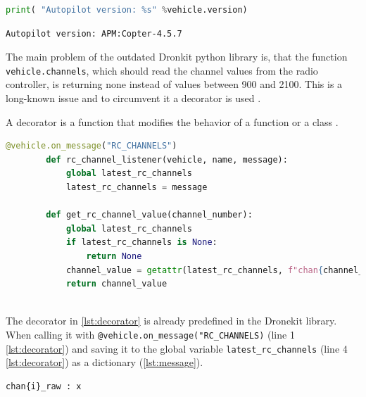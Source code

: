 \documentclass[svgnames]{article}
\begin{document}
	\begin{lstlisting}[language=python, caption={information retrieval}, label=lst:listing-autopilot, style=myPython]
		print( "Autopilot version: %s" %vehicle.version)
	\end{lstlisting}
	\begin{lstlisting}[caption= output from \cref{lst:listing-autopilot}]
		Autopilot version: APM:Copter-4.5.7
	\end{lstlisting}

	The main problem of the outdated Dronkit python library is, that the function \lstinline|vehicle.channels|, which should read the channel values from the radio controller, is returning none instead of values between 900 and 2100. This is a long-known issue and to circumvent it a decorator is used \cite{rcchannelissue}. 

	\begin{Explanation}[Decorator]
		\item A decorator is a function that modifies the behavior of a function or a class \cite{decorator}.
	\end{Explanation} 
	
	\begin{lstlisting}[language=python, style=myPython, label=lst:decorator, caption={decorator for channel values}]
		@vehicle.on_message("RC_CHANNELS")
		def rc_channel_listener(vehicle, name, message):
			global latest_rc_channels
			latest_rc_channels = message
		
		def get_rc_channel_value(channel_number):
			global latest_rc_channels
			if latest_rc_channels is None:
				return None
			channel_value = getattr(latest_rc_channels, f"chan{channel_number}_raw", None)
			return channel_value
		
	\end{lstlisting}
	The decorator in \cref{lst:decorator} is already predefined in the Dronekit library. When calling it with \lstinline|@vehicle.on_message("RC_CHANNELS)| (line 1 \cref{lst:decorator}) and saving it to the global variable \lstinline|latest_rc_channels| (line 4 \cref{lst:decorator}) as a dictionary (\cref{lst:message}).
	
	\begin{lstlisting}[label=lst:message, caption={output from decorator in \cref{lst:decorator}\protect\footnote{}}]
		chan{i}_raw : x
	\end{lstlisting}
	
\end{document}
